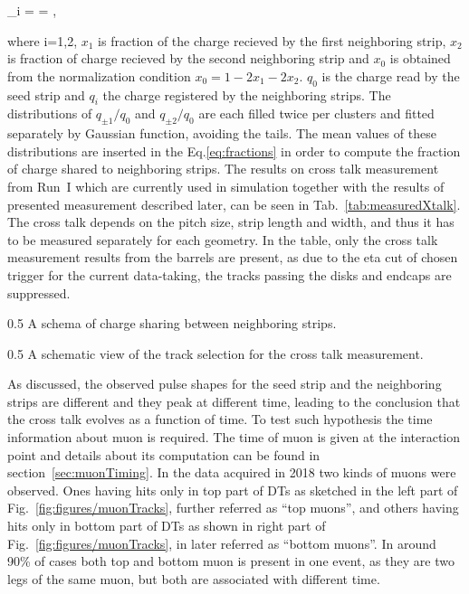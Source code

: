{
\eta_{\pm i} =  =  ,
}

where i=1,2, $x_{1}$ is fraction of the charge recieved by the first neighboring strip,  $x_{2}$ is fraction of charge recieved by the second neighboring strip and $x_{0}$ is obtained from the normalization condition $x_{0} = 1-2x_{1}-2x_{2}$. $q_{0}$ is the charge read by the seed strip and $q_{i}$ the charge registered by the neighboring strips. The distributions of $q_{\pm 1}/q_{0}$ and $q_{\pm 2}/q_{0}$ are each filled twice per clusters and fitted separately by Gaussian function, avoiding the tails. The mean values of these distributions are inserted in the Eq.\ref{eq:fractions} in order to compute the fraction of charge shared to neighboring strips. The results on cross talk measurement from Run~I which are currently used in simulation together with the results of presented measurement described later, can be seen in Tab.~\ref{tab:measuredXtalk}. The cross talk depends on the pitch size, strip length and width, and thus it has to be measured separately for each geometry. In the table, only the cross talk measurement results from the barrels are present, as due to the eta cut of chosen trigger for the current data-taking, the tracks passing the disks and endcaps are suppressed. 

                 {0.5}       %
                 { A schema of charge sharing between neighboring strips. }

                 {0.5}       %
                 { A schematic view of the track selection for the cross talk measurement. }


As discussed, the observed pulse shapes for the seed strip and the neighboring strips are different and they peak at different time, leading to the conclusion that the cross talk evolves as a function of time. To test such hypothesis the time information about muon is required. The time of muon is given at the interaction point and details about its computation can be found in section~\ref{sec:muonTiming}. In the data acquired in 2018 two kinds of muons were observed. Ones having hits only in top part of DTs as sketched in the left part of Fig.~\ref{fig:figures/muonTracks}, further referred as ``top muons'',  and others having hits only in bottom part of DTs as shown in right part of Fig.~\ref{fig:figures/muonTracks}, in later referred as ``bottom muons''. In around 90\% of cases both top and bottom muon is present in one event, as they are two legs of the same muon, but both are associated with different time. 

